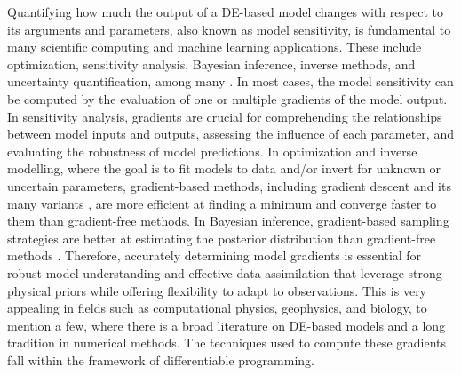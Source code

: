 Quantifying how much the output of a DE-based model changes with respect to its arguments and parameters, also known as model sensitivity, is fundamental to many scientific computing and machine learning applications. 
These include optimization, sensitivity analysis, Bayesian inference, inverse methods, and uncertainty quantification, among many \cite{Razavi.2021}. 
In most cases, the model sensitivity can be computed by the evaluation of one or multiple gradients of the model output. 
In sensitivity analysis, gradients are crucial for comprehending the relationships between model inputs and outputs, assessing the influence of each parameter, and evaluating the robustness of model predictions. 
In optimization and inverse modelling, where the goal is to fit models to data and/or invert for unknown or uncertain parameters, gradient-based methods, including gradient descent and its many variants \cite{ruder2016overview-gradient-descent}, are more efficient at finding a minimum and converge faster to them than gradient-free methods.
In Bayesian inference, gradient-based sampling strategies are better at estimating the posterior distribution than gradient-free methods \cite{neal2011mcmc}.
Therefore, accurately determining model gradients is essential for robust model understanding and effective data assimilation that leverage strong physical priors while offering flexibility to adapt to observations. 
This is very appealing in fields such as computational physics, geophysics, and biology, to mention a few, where there is a broad literature on DE-based models and a long tradition in numerical methods. 
The techniques used to compute these gradients fall within the framework of differentiable programming.

